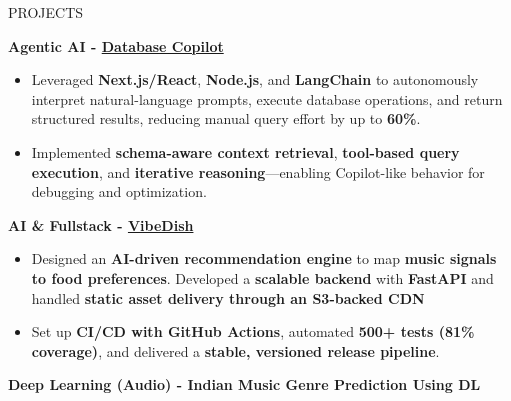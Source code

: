 \documentclass{resume} %
\begin{document}
\begin{rSection}{PROJECTS}
\vspace{-1em}

\item \textbf{Agentic AI - \href{https://github.com/MulyaP/Database-Copilot}{Database Copilot}}
\begin{itemize}
\vspace{-0.5em}
   \item Leveraged \textbf{Next.js/React}, \textbf{Node.js}, and \textbf{LangChain} to autonomously interpret natural-language prompts, execute database operations, and return structured results, reducing manual query effort by up to \textbf{60\%}.
    \vspace{-0.5em}
    \item Implemented \textbf{schema-aware context retrieval}, \textbf{tool-based query execution}, and \textbf{iterative reasoning}—enabling Copilot-like behavior for debugging and optimization.
\end{itemize}

\vspace{-0.5em}

\item \textbf{AI \& Fullstack - \href{https://github.com/MulyaP/VibeDish-Project-3}{VibeDish}}
\vspace{-0.5em}
\begin{itemize}
    \item Designed an \textbf{AI-driven recommendation engine} to map \textbf{music signals to food preferences}. Developed a \textbf{scalable backend} with \textbf{FastAPI} and handled \textbf{static asset delivery through an S3-backed CDN}
    \vspace{-0.5em}
    \item Set up \textbf{CI/CD with GitHub Actions}, automated \textbf{500+ tests (81\% coverage)}, and delivered a \textbf{stable, versioned release pipeline}.
\end{itemize}
\vspace{-0.5em}

\item \textbf{Deep Learning (Audio) - Indian Music Genre Prediction Using DL}
  \vspace{-0.5em}
 \begin{itemize}
 

\end{itemize}
\end{rSection}
\end{document}
